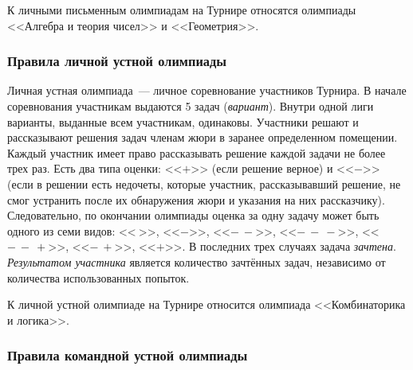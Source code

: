 К личными письменным олимпиадам на Турнире относятся олимпиады
<<Алгебра и теория чисел>> и <<Геометрия>>.

\subsubsection*{Правила личной устной олимпиады}

Личная устная олимпиада~---
личное соревнование участников Турнира.
В начале соревнования участникам выдаются 5 задач (\emph{вариант}).
Внутри одной лиги варианты, выданные всем участникам, одинаковы.
Участники решают и рассказывают решения задач членам жюри в заранее
определенном помещении.
Каждый участник имеет право рассказывать решение каждой задачи не более трех
раз.
Есть два типа оценки:
<<$+$>>
(если решение верное)
и <<$-$>>
(если в решении есть недочеты, которые участник, рассказывавший решение, не
смог устранить после их обнаружения жюри и указания на них рассказчику).
Следовательно, по окончании олимпиады оценка за одну задачу может быть одного
из семи видов:
<<$\ $>>,
<<$-$>>,
<<$-\ -$>>,
<<$-\ -\ -$>>,
<<$-\ -\ +$>>,
<<$-\ +$>>,
<<$+$>>.
В последних трех случаях задача \emph{зачтена}.
\emph{Результатом участника} является количество зачтённых задач, независимо от
количества использованных попыток.

К личной устной олимпиаде на Турнире относится олимпиада
<<Комбинаторика и логика>>.

\subsubsection*{Правила командной устной олимпиады}

